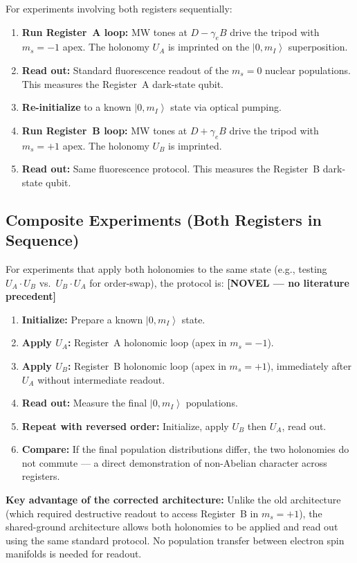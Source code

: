 \documentclass[11pt,letterpaper]{article}
\newcommand{\ket}[1]{\left|#1\right\rangle}
\newcommand{\novel}{\textcolor{purple!70!black}{\textbf{[NOVEL --- no literature precedent]}}}
\begin{document}
\medskip
\noindent For experiments involving both registers sequentially:
\begin{enumerate}[leftmargin=*]
    \item \textbf{Run Register~A loop:} MW tones at $D - \gamma_e B$ drive the tripod with $m_s = -1$ apex. The holonomy $U_A$ is imprinted on the $\ket{0, m_I}$ superposition.
    \item \textbf{Read out:} Standard fluorescence readout of the $m_s = 0$ nuclear populations. This measures the Register~A dark-state qubit.
    \item \textbf{Re-initialize} to a known $\ket{0, m_I}$ state via optical pumping.
    \item \textbf{Run Register~B loop:} MW tones at $D + \gamma_e B$ drive the tripod with $m_s = +1$ apex. The holonomy $U_B$ is imprinted.
    \item \textbf{Read out:} Same fluorescence protocol. This measures the Register~B dark-state qubit.
\end{enumerate}

\subsection{Composite Experiments (Both Registers in Sequence)}

For experiments that apply both holonomies to the same state (e.g., testing $U_A \cdot U_B$ vs.\ $U_B \cdot U_A$ for order-swap), the protocol is: \novel
\begin{enumerate}[leftmargin=*]
    \item \textbf{Initialize:} Prepare a known $\ket{0, m_I}$ state.
    \item \textbf{Apply $U_A$:} Register~A holonomic loop (apex in $m_s = -1$).
    \item \textbf{Apply $U_B$:} Register~B holonomic loop (apex in $m_s = +1$), immediately after $U_A$ without intermediate readout.
    \item \textbf{Read out:} Measure the final $\ket{0, m_I}$ populations.
    \item \textbf{Repeat with reversed order:} Initialize, apply $U_B$ then $U_A$, read out.
    \item \textbf{Compare:} If the final population distributions differ, the two holonomies do not commute --- a direct demonstration of non-Abelian character across registers.
\end{enumerate}

\medskip
\noindent\textbf{Key advantage of the corrected architecture:} Unlike the old architecture (which required destructive readout to access Register~B in $m_s = +1$), the shared-ground architecture allows both holonomies to be applied and read out using the same standard protocol. No population transfer between electron spin manifolds is needed for readout.
\end{document}
